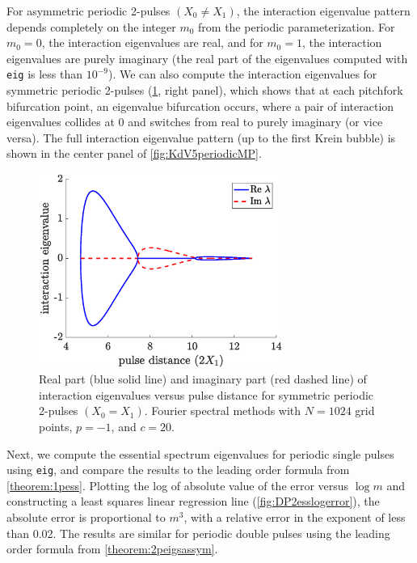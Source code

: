 \documentclass[12pt]{elsarticle}
\theoremstyle{plain}
\theoremstyle{definition}
\theoremstyle{remark}
\numberwithin{theorem}{section}
\numberwithin{equation}{section}
\begin{document}
For asymmetric periodic 2-pulses $(X_0 \neq X_1)$, the interaction eigenvalue pattern depends completely on the integer $m_0$ from the periodic parameterization. For $m_0 = 0$, the interaction eigenvalues are real, and for $m_0 = 1$, the interaction eigenvalues are purely imaginary (the real part of the eigenvalues computed with \texttt{eig} is less than $10^{-9}$). We can also compute the interaction eigenvalues for symmetric periodic 2-pulses (\cref{fig:periodiceigbif}, right panel), which shows that at each pitchfork bifurcation point, an eigenvalue bifurcation occurs, where a pair of interaction eigenvalues collides at 0 and switches from real to purely imaginary (or vice versa). The full interaction eigenvalue pattern (up to the first Krein bubble) is shown in the center panel of \cref{fig:KdV5periodicMP}.
\begin{figure}
\begin{center}
\includegraphics[width=8cm]{images/periodicequaleigbif.eps}
\end{center}
\caption{Real part (blue solid line) and imaginary part (red dashed line) of interaction eigenvalues versus pulse distance for symmetric periodic 2-pulses $(X_0 = X_1)$. Fourier spectral methods with $N = 1024$ grid points, $p = -1$, and $c = 20$. }
\label{fig:periodiceigbif}
\end{figure}
Next, we compute the essential spectrum eigenvalues for periodic single pulses using \texttt{eig}, and compare the results to the leading order formula from \cref{theorem:1pess}. Plotting the log of absolute value of the error versus $\log m$ and constructing a least squares linear regression line (\cref{fig:DP2esslogerror}), the absolute error is proportional to $m^3$, with a relative error in the exponent of less than 0.02. The results are similar for periodic double pulses using the leading order formula from \cref{theorem:2peigsassym}. 
\end{document}
